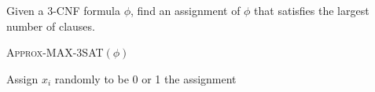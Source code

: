 \documentclass{article}
\newenvironment{definition}[2][Definition]{\begin{trivlist}
\item[\hskip \labelsep {\bfseries #1}\hskip \labelsep {\bfseries #2.}]}{\end{trivlist}}
\newenvironment{envsection}[1]{\begin{trivlist}
\item[\hskip \labelsep {\bfseries #1}]}{\end{trivlist}}
\begin{document}

\begin{envsection}{Optimization Problem (MAX-$3$SAT)}
    Given a 3-CNF formula $\phi$, find an assignment of $\phi$ that satisfies the largest number of clauses.
\end{envsection}


\begin{algorithm}
    \caption{\textsc{Approx-MAX-3SAT}$(\phi)$}
    \begin{algorithmic}
            \State Assign $x_i$ randomly to be 0 or 1
        \EndFor
        \State \Return the assignment
    \end{algorithmic}
\end{algorithm}
\end{document}
